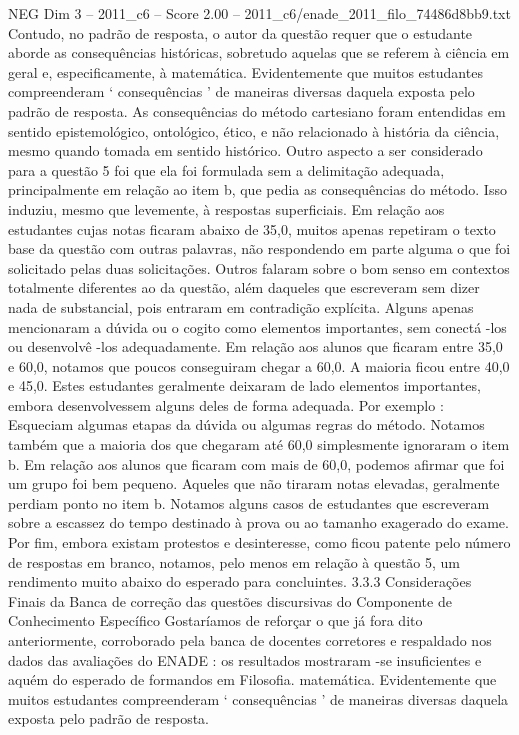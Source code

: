\begin{textsample}{NEG Dim 3 – 2011\_c6 – Score 2.00 – 2011\_c6/enade\_2011\_filo\_74486d8bb9.txt}
Contudo, no padrão de resposta, o autor da questão requer que o estudante aborde as consequências históricas, sobretudo aquelas que se referem à ciência em geral e, especificamente, à matemática.
Evidentemente que muitos estudantes compreenderam ‘ consequências ’ de maneiras diversas daquela exposta pelo padrão de resposta.
As consequências do método cartesiano foram entendidas em sentido epistemológico, ontológico, ético, e não relacionado à história da ciência, mesmo quando tomada em sentido histórico.
Outro aspecto a ser considerado para a questão 5 foi que ela foi formulada sem a delimitação adequada, principalmente em relação ao item b, que pedia as consequências do método.
Isso induziu, mesmo que levemente, à respostas superficiais.
Em relação aos estudantes cujas notas ficaram abaixo de 35,0, muitos apenas repetiram o texto base da questão com outras palavras, não respondendo em parte alguma o que foi solicitado pelas duas solicitações.
Outros falaram sobre o bom senso em contextos totalmente diferentes ao da questão, além daqueles que escreveram sem dizer nada de substancial, pois entraram em contradição explícita.
Alguns apenas mencionaram a dúvida ou o cogito como elementos importantes, sem conectá -los ou desenvolvê -los adequadamente.
Em relação aos alunos que ficaram entre 35,0 e 60,0, notamos que poucos conseguiram chegar a 60,0.
A maioria ficou entre 40,0 e 45,0.
Estes estudantes geralmente deixaram de lado elementos importantes, embora desenvolvessem alguns deles de forma adequada.
Por exemplo : Esqueciam algumas etapas da dúvida ou algumas regras do método.
Notamos também que a maioria dos que chegaram até 60,0 simplesmente ignoraram o item b.
Em relação aos alunos que ficaram com mais de 60,0, podemos afirmar que foi um grupo foi bem pequeno.
Aqueles que não tiraram notas elevadas, geralmente perdiam ponto no item b.
Notamos alguns casos de estudantes que escreveram sobre a escassez do tempo destinado à prova ou ao tamanho exagerado do exame.
Por fim, embora existam protestos e desinteresse, como ficou patente pelo número de respostas em branco, notamos, pelo menos em relação à questão 5, um rendimento muito abaixo do esperado para concluintes. 3.3.3 Considerações Finais da Banca de correção das questões discursivas do Componente de Conhecimento Específico Gostaríamos de reforçar o que já fora dito anteriormente, corroborado pela banca de docentes corretores e respaldado nos dados das avaliações do ENADE : os resultados mostraram -se insuficientes e aquém do esperado de formandos em Filosofia. matemática.
Evidentemente que muitos estudantes compreenderam ‘ consequências ’ de maneiras diversas daquela exposta pelo padrão de resposta.

\end{textsample}
